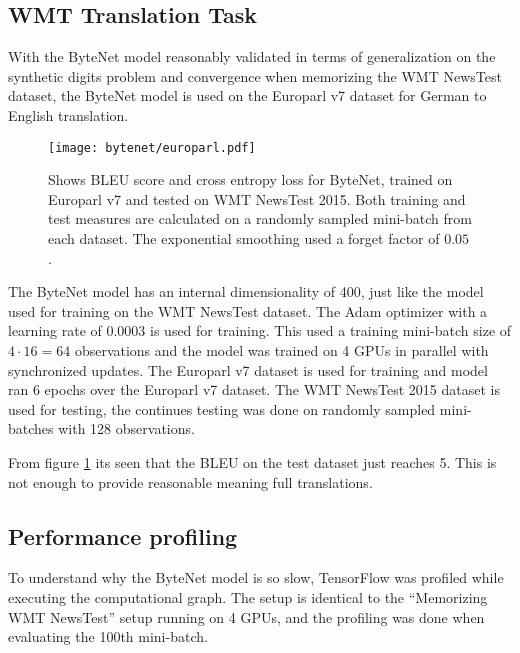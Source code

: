 \clearpage
\subsection{WMT Translation Task}

With the ByteNet model reasonably validated in terms of generalization on the synthetic digits problem and convergence when memorizing the WMT NewsTest dataset, the ByteNet model is used on the Europarl v7 dataset for German to English translation.

\begin{figure}[h]
    \centering
    \texttt{[image: bytenet/europarl.pdf]}
    \caption{Shows BLEU score and cross entropy loss for ByteNet, trained on Europarl v7 and tested on WMT NewsTest 2015. Both training and test measures are calculated on a randomly sampled mini-batch from each dataset. The exponential smoothing used a forget factor of $0.05$.}
    \label{fig:result:bytenet:europarl}
\end{figure}

The ByteNet model has an internal dimensionality of 400, just like the model used for training on the WMT NewsTest dataset. The Adam optimizer with a learning rate of 0.0003 is used for training. This used a training mini-batch size of $4 \cdot 16 = 64$ observations and the model was trained on 4 GPUs in parallel with synchronized updates. The Europarl v7 dataset is used for training and model ran 6 epochs over the Europarl v7 dataset. The WMT NewsTest 2015 dataset is used for testing, the continues testing was done on randomly sampled mini-batches with 128 observations.

From figure \ref{fig:result:bytenet:europarl} its seen that the BLEU on the test dataset just reaches 5. This is not enough to provide reasonable meaning full translations.


\clearpage
\subsection{Performance profiling}
To understand why the ByteNet model is so slow, TensorFlow was profiled while executing the computational graph. The setup is identical to the ``Memorizing WMT NewsTest'' setup running on 4 GPUs, and the profiling was done when evaluating the 100th mini-batch.

